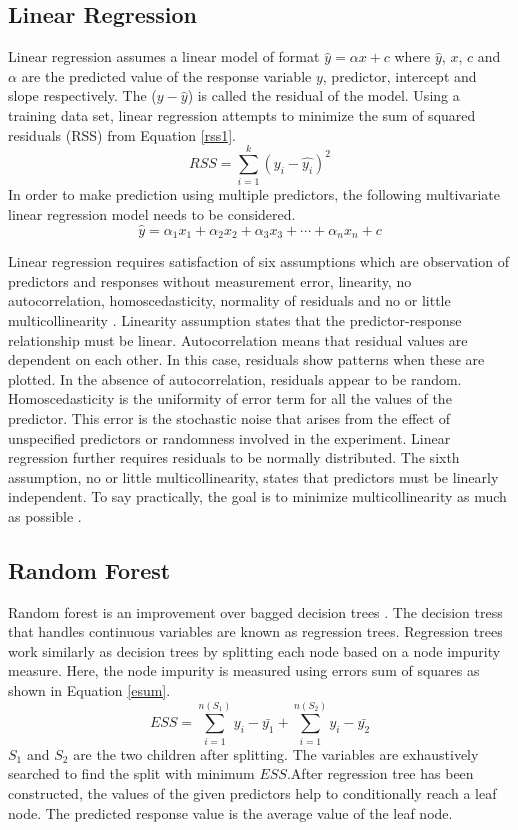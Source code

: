 \documentclass[preprint,review,12pt]{elsarticle}
\begin{document}
\subsection{Linear Regression}
Linear regression assumes a linear model of format $\hat{y}=\alpha x+c$ where $\hat{y}$, $x$, $c$ and $\alpha$ are the predicted value of the response variable $y$, predictor, intercept and slope respectively. The ($y-\hat{y}$) is called the residual of the model. Using a training data set, linear regression attempts to minimize the sum of squared residuals (RSS) from Equation \ref{rss1}.
\begin{equation} \label{rss1}
RSS= \sum_{i=1}^{k} (y_{i}-\hat{y_{i}})^{2}
\end{equation}
In order to make prediction using multiple predictors, the following multivariate linear regression model needs to be considered.
\begin{equation}
\hat{y}=\alpha_{1} x_{1}+\alpha_{2} x_{2}+\alpha_{3} x_{3}+ \cdots +\alpha_{n} x_{n}+c
\end{equation}

Linear regression requires satisfaction of six assumptions which are observation of predictors and responses without measurement error, linearity, no autocorrelation, homoscedasticity, normality of residuals and no or little multicollinearity \cite{poole1971assumptions}. Linearity assumption states that the predictor-response relationship must be linear. Autocorrelation means that residual values are dependent on each other. In this case, residuals show patterns when these are plotted. In the absence of autocorrelation, residuals appear to be random. Homoscedasticity is the uniformity of error term for all the values of the predictor. This error is the stochastic noise that arises from the effect of unspecified predictors or randomness involved in the experiment. Linear regression further requires residuals to be normally distributed. The sixth assumption, no or little multicollinearity, states that predictors must be linearly independent. To say practically, the goal is to minimize multicollinearity as much as possible \cite{poole1971assumptions}.

\subsection{Random Forest}
Random forest is an improvement over bagged decision trees \cite{breiman2001random}. The decision tress that handles continuous variables are known as regression trees. Regression trees work similarly as decision trees by splitting each node based on a node impurity measure. Here, the node impurity is measured using errors sum of squares as shown in Equation \ref{esum}. 
\begin{equation}
ESS=\sum_{i=1}^{n(S_{1})} y_{i}-\bar{y_{1}}+ \sum_{i=1}^{n(S_{2})} y_{i}-\bar{y_{2}}
\label{esum}
\end{equation}
$S_{1}$ and $S_{2}$ are the two children after splitting. The variables are exhaustively searched to find the split with minimum $ESS$.After regression tree has been constructed, the values of the given predictors help to conditionally reach a leaf node. The predicted response value is the average value of the leaf node.
\end{document}
